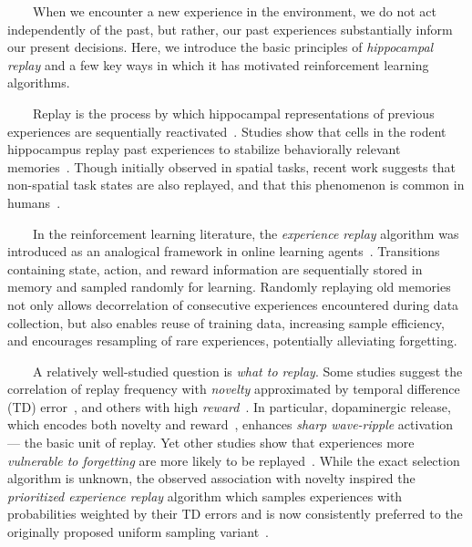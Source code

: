 \documentclass[letterpaper,11pt]{article}
\def\emdash{---}
\begin{document}
\begin{center}
  \begin{tcolorbox}[breakable,sharp corners=all,coltitle=black,colbacktitle=white,
    width=\textwidth,boxsep=5pt,left=5pt,right=5pt,
    title={\textbf{Box B: Replaying Experience, Consolidating Memory}}]
    
~~~~When we encounter a new experience in the environment, we do not act independently of the past, but rather, our past experiences substantially inform our present decisions. Here, we introduce the basic principles of \textit{hippocampal replay} and a few key ways in which it has motivated reinforcement learning algorithms.

~~~~Replay is the process by which hippocampal representations of previous experiences are sequentially reactivated~\cite{CarretalNATURE-NEUROSCIENCE-11}. Studies show that cells in the rodent hippocampus replay past experiences to stabilize behaviorally relevant memories~\cite{OlafsdottirCURRENT-BIOLOGY-18,JooandFrankNATURE-REVIEWS-NEUROSCIENCE-18}. Though initially observed in spatial tasks, recent work suggests that non-spatial task states are also replayed, and that this phenomenon is common in humans~\cite{SchuckandNivDOI-18}. 

~~~~In the reinforcement learning literature, the \textit{experience replay} algorithm was introduced as an analogical framework in online learning agents~\cite{LinML-92}. Transitions containing state, action, and reward information are sequentially stored in memory and sampled randomly for learning. Randomly replaying old memories not only allows decorrelation of consecutive experiences encountered during data collection, but also enables reuse of training data, increasing sample efficiency, and encourages resampling of rare experiences, potentially alleviating forgetting. 

~~~~A relatively well-studied question is \textit{what to replay}. Some studies suggest the correlation of replay frequency with \textit{novelty} approximated by temporal difference (TD) error~\cite{FosterandWilsonNATURE-06}, and others with high \textit{reward}~\cite{OlafsdottirCURRENT-BIOLOGY-18}. In particular, dopaminergic release, which encodes both novelty and reward~\cite{MenegasetalELIFE-17}, enhances {\textit{sharp wave-ripple}} activation \emdash{} the basic unit of replay. Yet other studies show that experiences more \textit{vulnerable to forgetting} are more likely to be replayed~\cite{SchapiroetalNATURE-COMMUNICATIONS-18}. While the exact selection algorithm is unknown, the observed association with novelty inspired the \textit{prioritized experience replay} algorithm which samples experiences with probabilities weighted by their TD errors and is now consistently preferred to the originally proposed uniform sampling variant~\cite{SchauletalCoRR-15}. 


\end{tcolorbox}
\end{center}
\end{document}
